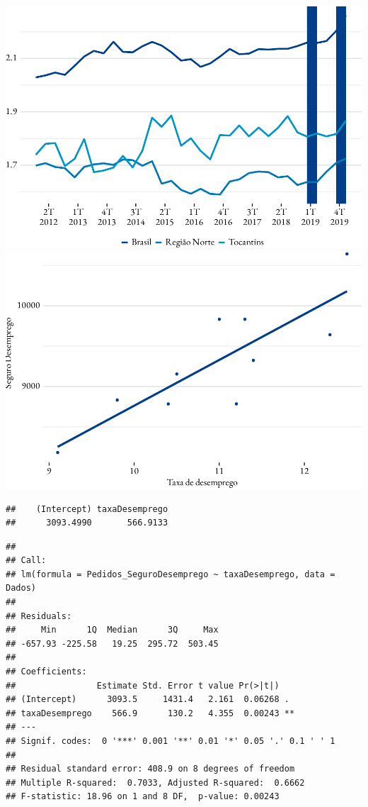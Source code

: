 \includegraphics{fig/rend_medio-1.pdf}
\includegraphics{fig/reg_emprego-1.pdf}

\begin{verbatim}
##    (Intercept) taxaDesemprego 
##      3093.4990       566.9133
\end{verbatim}

\begin{verbatim}
## 
## Call:
## lm(formula = Pedidos_SeguroDesemprego ~ taxaDesemprego, data = Dados)
## 
## Residuals:
##     Min      1Q  Median      3Q     Max 
## -657.93 -225.58   19.25  295.72  503.45 
## 
## Coefficients:
##                Estimate Std. Error t value Pr(>|t|)   
## (Intercept)      3093.5     1431.4   2.161  0.06268 . 
## taxaDesemprego    566.9      130.2   4.355  0.00243 **
## ---
## Signif. codes:  0 '***' 0.001 '**' 0.01 '*' 0.05 '.' 0.1 ' ' 1
## 
## Residual standard error: 408.9 on 8 degrees of freedom
## Multiple R-squared:  0.7033, Adjusted R-squared:  0.6662 
## F-statistic: 18.96 on 1 and 8 DF,  p-value: 0.00243
\end{verbatim}

